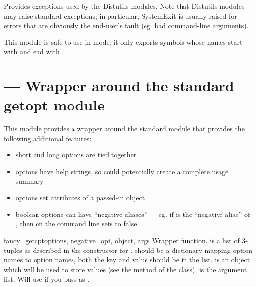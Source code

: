 \documentclass{manual}
\begin{document}
Provides exceptions used by the Distutils modules.  Note that Distutils
modules may raise standard exceptions; in particular, SystemExit is
usually raised for errors that are obviously the end-user's fault
(eg. bad command-line arguments).

This module is safe to use in  mode; it only exports
symbols whose names start with  and end with .

\section{
         --- Wrapper around the standard getopt module}

This module provides a wrapper around the standard  
module that provides the following additional features:

\begin{itemize}
\item short and long options are tied together
\item options have help strings, so  could potentially 
create a complete usage summary
\item options set attributes of a passed-in object
\item boolean options can have ``negative aliases'' --- eg. if
 is the ``negative alias'' of
, then  on the command
line sets  to false.

\end{itemize}


\begin{funcdesc}{fancy_getopt}{options, negative_opt, object, args}
Wrapper function.  is a list of
 3-tuples as described in the
constructor for .  should be a dictionary
mapping option names to option names, both the key and value should be in the
 list.  is an object which will be used to store
values (see the  method of the  class).
 is the argument list. Will use  if you 
pass  as .
\end{funcdesc}
\end{document}
